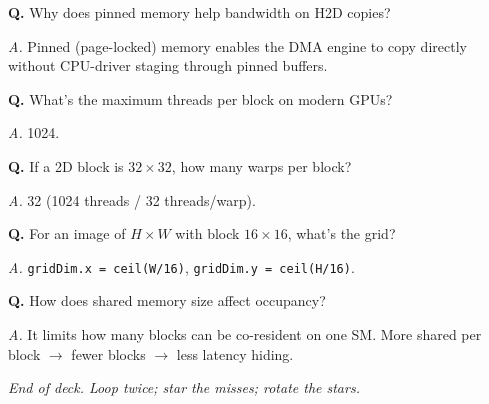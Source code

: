 \documentclass[10pt]{article}
\newcommand{\q}[1]{\par\vspace{6pt}\noindent\textbf{Q.} #1}
\newcommand{\ans}[1]{\par\noindent\textit{A.} #1\par}
\begin{document}
\q{Why does pinned memory help bandwidth on H2D copies?}
\ans{Pinned (page-locked) memory enables the DMA engine to copy directly without CPU-driver staging through pinned buffers.}

\q{What's the maximum threads per block on modern GPUs?}
\ans{1024.}

\q{If a 2D block is $32 \times 32$, how many warps per block?}
\ans{32 (1024 threads / 32 threads/warp).}

\q{For an image of $H \times W$ with block $16\times 16$, what's the grid?}
\ans{\texttt{gridDim.x = ceil(W/16)}, \texttt{gridDim.y = ceil(H/16)}.}

\q{How does shared memory size affect occupancy?}
\ans{It limits how many blocks can be co-resident on one SM. More shared per block $\rightarrow$ fewer blocks $\rightarrow$ less latency hiding.}

\hrulefill

\textit{End of deck. Loop twice; star the misses; rotate the stars.}
\end{document}
